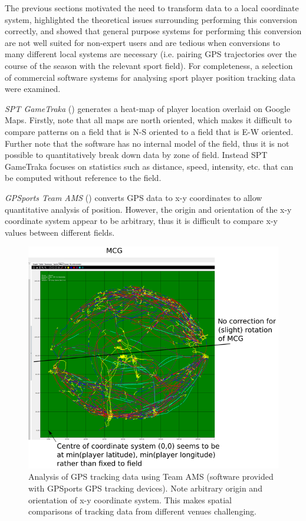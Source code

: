 
The previous sections motivated the need to transform data to a local coordinate system, highlighted the theoretical issues surrounding performing this conversion correctly, and showed that general purpose systems for performing this conversion are not well suited for non-expert users and are tedious when conversions to many different local systems are necessary (i.e. pairing GPS trajectories over the course of the season with the relevant sport field). For completeness, a selection of commercial software systems for analysing sport player position tracking data were examined.

\textit{SPT GameTraka} () generates a heat-map of player location overlaid on Google Maps. Firstly, note that all maps are north oriented, which makes it difficult to compare patterns on a field that is N-S oriented to a field that is E-W oriented. Further note that the software has no internal model of the field, thus it is not possible to quantitatively break down data by zone of field. Instead SPT GameTraka focuses on statistics such as distance, speed, intensity, etc. that can be computed without reference to the field.

\textit{GPSports Team AMS} () converts GPS data to x-y coordinates to allow quantitative analysis of position. However, the origin and orientation of the x-y coordinate system appear to be arbitrary, thus it is difficult to compare x-y values between different fields.

\begin{figure}[H]
\centering
\includegraphics[width=0.75\linewidth]{figs/spatial/limitations-of-gpsports-team-ams.png}
\caption{Analysis of GPS tracking data using Team AMS (software provided with GPSports GPS tracking devices). Note arbitrary origin and orientation of x-y coordinate system. This makes spatial comparisons of tracking data from different venues challenging.
\label{fig:limitations-of-gpsports-team-ams}}
\end{figure}

